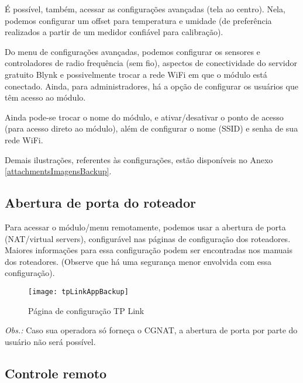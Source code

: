 É possível, também, acessar as configurações avançadas (tela ao centro). Nela, podemos configurar um offset para temperatura e umidade (de preferência realizados a partir de um medidor confiável para calibração).

Do menu de configurações avançadas, podemos configurar os sensores e controladores de radio frequência (sem fio), aspectos de conectividade do servidor gratuito Blynk e possivelmente trocar a rede WiFi em que o módulo está conectado. Ainda, para administradores, há a opção de configurar os usuários que têm acesso ao módulo.

Ainda pode-se trocar o nome do módulo, e ativar/desativar o ponto de acesso (para acesso direto ao módulo), além de configurar o nome (SSID) e senha de sua rede WiFi.

Demais ilustrações, referentes às configurações, estão disponíveis no Anexo \ref{attachmentsImagensBackup}{}.

\subsection{Abertura de porta do roteador}


Para acessar o módulo/menu remotamente, podemos usar a abertura de porta (NAT/virtual servers), configurável nas páginas de configuração dos roteadores. Maiores informações para essa configuração podem ser encontradas nos manuais dos roteadores. (Observe que há uma segurança menor envolvida com essa configuração).

\begin{figure}[hbp]
    \centering
    \caption{Página de configuração TP Link}
    \texttt{[image: tpLinkAppBackup]}
    \label{fig:tpLinkAppBackup}
\end{figure}

\emph{Obs.:} Caso sua operadora só forneça o CGNAT, a abertura de porta por parte do usuário não será possível.

\subsection{Controle remoto}

